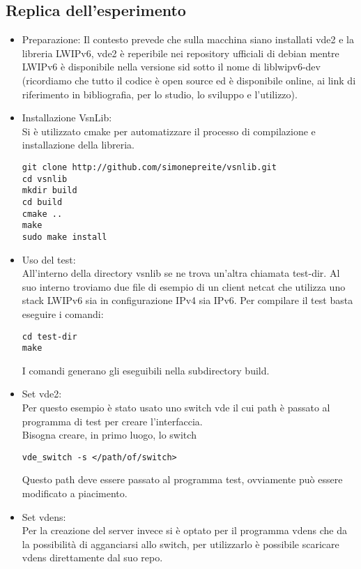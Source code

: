 \subsection{Replica dell'esperimento}
\begin{itemize}
  \item Preparazione: Il contesto prevede che sulla macchina siano installati vde2 e la libreria LWIPv6, vde2 \`e reperibile nei repository ufficiali di debian mentre LWIPv6 \`e disponibile nella versione sid sotto il nome di liblwipv6-dev (ricordiamo che tutto il codice \`e open source ed \`e disponibile online, ai link di riferimento in bibliografia, per lo studio, lo sviluppo e l'utilizzo).\\
  \item Installazione VsnLib:\\
  Si \`e utilizzato cmake per automatizzare il processo di compilazione e installazione della libreria.
  \begin{lstlisting}[language=Bashn]
git clone http://github.com/simonepreite/vsnlib.git
cd vsnlib
mkdir build
cd build
cmake ..
make
sudo make install
\end{lstlisting}
  \item Uso del test:\\
  All'interno della directory vsnlib se ne trova un'altra chiamata test-dir. Al suo interno troviamo due file di esempio di un client netcat che utilizza uno stack LWIPv6 sia in configurazione IPv4 sia IPv6. Per compilare il test basta eseguire i comandi:
  \begin{lstlisting}[language=Bashn]
cd test-dir
make
  \end{lstlisting}
  I comandi generano gli eseguibili nella subdirectory build.
  \item Set vde2:\\
  Per questo esempio \`e stato usato uno switch vde il cui path \`e passato al programma di test per creare l'interfaccia.\\
  Bisogna creare, in primo luogo, lo switch
  \begin{lstlisting}[language=Bashn]
vde_switch -s </path/of/switch>
  \end{lstlisting}
  Questo path deve essere passato al programma test, ovviamente pu\`o essere modificato a piacimento.\\
\item Set vdens:\\
  Per la creazione del server invece si \`e optato per il programma vdens che da la possibilit\`a di agganciarsi allo switch, per utilizzarlo \`e possibile scaricare vdens direttamente dal suo repo\cite{K16}.\\

\end{itemize}
